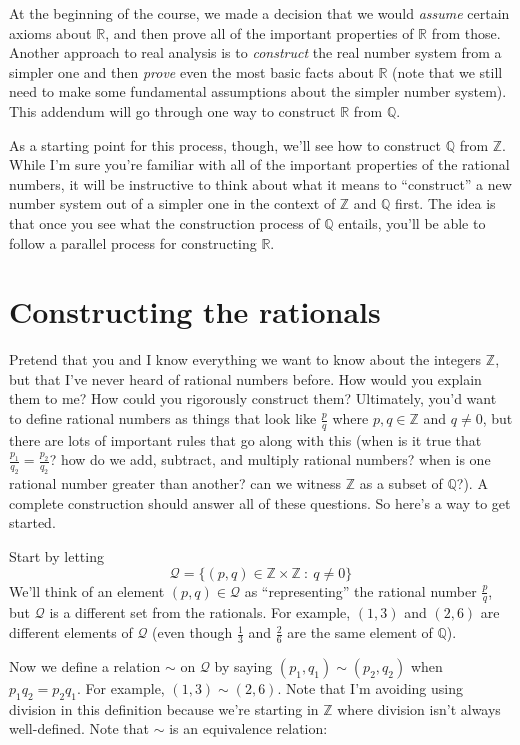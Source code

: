 \documentclass[
  letterpaper,
  DIV=11,
  numbers=noendperiod]{scrreprt}
\def\R{\mathbb R}
\def\Q{\mathbb Q}
\def\Z{\mathbb Z}
\theoremstyle{plain}
\theoremstyle{definition}
\theoremstyle{plain}
\theoremstyle{plain}
\theoremstyle{definition}
\theoremstyle{definition}
\theoremstyle{remark}
\begin{document}
At the beginning of the course, we made a decision that we would
\emph{assume} certain axioms about \(\R\), and then prove all of the
important properties of \(\R\) from those. Another approach to real
analysis is to \emph{construct} the real number system from a simpler
one and then \emph{prove} even the most basic facts about \(\R\) (note
that we still need to make some fundamental assumptions about the
simpler number system). This addendum will go through one way to
construct \(\R\) from \(\Q\).

As a starting point for this process, though, we'll see how to construct
\(\Q\) from \(\Z\). While I'm sure you're familiar with all of the
important properties of the rational numbers, it will be instructive to
think about what it means to ``construct'' a new number system out of a
simpler one in the context of \(\Z\) and \(\Q\) first. The idea is that
once you see what the construction process of \(\Q\) entails, you'll be
able to follow a parallel process for constructing \(\R\).

\section{Constructing the rationals}\label{constructing-the-rationals}

Pretend that you and I know everything we want to know about the
integers \(\Z\), but that I've never heard of rational numbers before.
How would you explain them to me? How could you rigorously construct
them? Ultimately, you'd want to define rational numbers as things that
look like \(\frac{p}{q}\) where \(p,q\in\Z\) and \(q\neq0\), but there
are lots of important rules that go along with this (when is it true
that \(\frac{p_1}{q_2}=\frac{p_2}{q_2}\)? how do we add, subtract, and
multiply rational numbers? when is one rational number greater than
another? can we witness \(\Z\) as a subset of \(\Q\)?). A complete
construction should answer all of these questions. So here's a way to
get started.

Start by letting \[\mathcal Q=\{(p,q)\in\Z\times\Z ~:~ q\neq0\}\] We'll
think of an element \((p,q)\in\mathcal Q\) as ``representing'' the
rational number \(\frac{p}{q}\), but \(\mathcal Q\) is a different set
from the rationals. For example, \((1,3)\) and \((2,6)\) are different
elements of \(\mathcal Q\) (even though \(\frac{1}{3}\) and
\(\frac{2}{6}\) are the same element of \(\Q\)).

Now we define a relation \(\sim\) on \(\mathcal Q\) by saying
\((p_1,q_1)\sim(p_2,q_2)\) when \(p_1q_2=p_2q_1\). For example,
\((1,3)\sim(2,6)\). Note that I'm avoiding using division in this
definition because we're starting in \(\Z\) where division isn't always
well-defined. Note that \(\sim\) is an equivalence relation:
\end{document}
